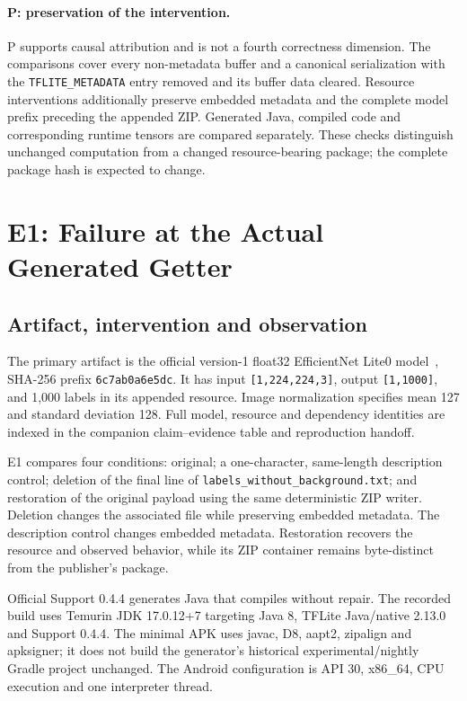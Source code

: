 \documentclass[10pt,twocolumn,letterpaper]{article}
\newcommand{\code}[1]{\texttt{#1}}
\begin{document}
\paragraph{P: preservation of the intervention.}
P supports causal attribution and is not a fourth correctness dimension. The comparisons cover every non-metadata buffer and a canonical serialization with the \code{TFLITE\_METADATA} entry removed and its buffer data cleared. Resource interventions additionally preserve embedded metadata and the complete model prefix preceding the appended ZIP. Generated Java, compiled code and corresponding runtime tensors are compared separately. These checks distinguish unchanged computation from a changed resource-bearing package; the complete package hash is expected to change.

\section{E1: Failure at the Actual Generated Getter}
\label{sec:e1}
\subsection{Artifact, intervention and observation}
The primary artifact is the official version-1 float32 EfficientNet Lite0 model~\cite{efficientnet}, SHA-256 prefix \code{6c7ab0a6e5dc}. It has input \code{[1,224,224,3]}, output \code{[1,1000]}, and 1,000 labels in its appended resource. Image normalization specifies mean 127 and standard deviation 128. Full model, resource and dependency identities are indexed in the companion claim--evidence table and reproduction handoff.

E1 compares four conditions: original; a one-character, same-length description control; deletion of the final line of \code{labels\_without\_background.txt}; and restoration of the original payload using the same deterministic ZIP writer. Deletion changes the associated file while preserving embedded metadata. The description control changes embedded metadata. Restoration recovers the resource and observed behavior, while its ZIP container remains byte-distinct from the publisher's package.

Official Support 0.4.4 generates Java that compiles without repair. The recorded build uses Temurin JDK 17.0.12+7 targeting Java 8, TFLite Java/native 2.13.0 and Support 0.4.4. The minimal APK uses javac, D8, aapt2, zipalign and apksigner; it does not build the generator's historical experimental/nightly Gradle project unchanged. The Android configuration is API 30, x86\_64, CPU execution and one interpreter thread.
\end{document}
